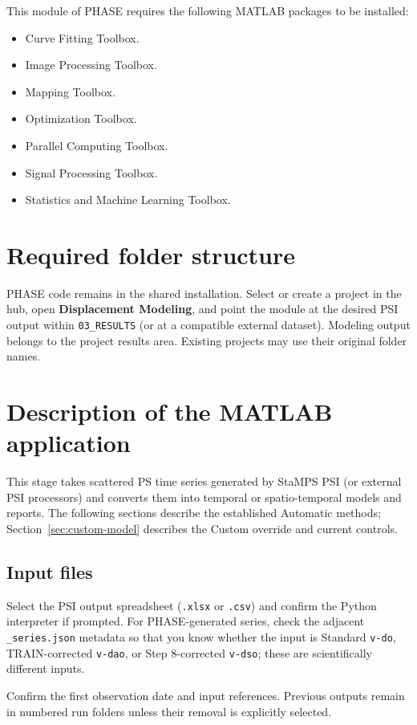 This module of PHASE requires the following MATLAB packages to be installed:
\begin{itemize}
    \item Curve Fitting Toolbox.
    \item Image Processing Toolbox.
    \item Mapping Toolbox.
    \item Optimization Toolbox.
    \item Parallel Computing Toolbox.
    \item Signal Processing Toolbox.
    \item Statistics and Machine Learning Toolbox.
\end{itemize}

\section{Required folder structure}

PHASE code remains in the shared installation. Select or create a project in the hub, open \textbf{Displacement Modeling}, and point the module at the desired PSI output within \texttt{03\_RESULTS} (or at a compatible external dataset). Modeling output belongs to the project results area. Existing projects may use their original folder names.

\section{Description of the MATLAB application}
This stage takes scattered PS time series generated by StaMPS PSI (or external PSI processors) and converts them into temporal or spatio-temporal models and reports. The following sections describe the established Automatic methods; Section~\ref{sec:custom-model} describes the Custom override and current controls.

\subsection{Input files}
Select the PSI output spreadsheet (\texttt{.xlsx} or \texttt{.csv}) and confirm the Python interpreter if prompted. For PHASE-generated series, check the adjacent \texttt{\_series.json} metadata so that you know whether the input is Standard \texttt{v-do}, TRAIN-corrected \texttt{v-dao}, or Step 8-corrected \texttt{v-dso}; these are scientifically different inputs.

Confirm the first observation date and input references. Previous outputs remain in numbered run folders unless their removal is explicitly selected.


